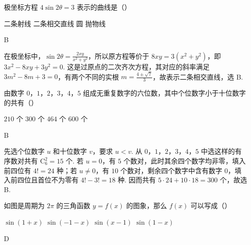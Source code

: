 \begin{problem}
极坐标方程 \(4\sin 2\theta=3\) 表示的曲线是（\quad）

\choices
    {二条射线}
    {二条相交直线}
    {圆}
    {抛物线}

\end{problem}

\begin{answer}
B
\end{answer}

\begin{solution}
在极坐标中，\(\sin2\theta=\frac{2xy}{x^2+y^2}\)，所以原方程等价于 \(8xy=3(x^2+y^2)\)，即 \(3x^2-8xy+3y^2=0\). 这是过原点的二次齐次方程，其对应的斜率满足 \(3m^2-8m+3=0\)，有两个不同的实根 \(m=\frac{4\pm\sqrt{7}}{3}\)，故表示二条相交直线，选 B.
\end{solution}

\begin{problem}
由数字 \(0\)，\(1\)，\(2\)，\(3\)，\(4\)，\(5\) 组成无重复数字的六位数，其中个位数字小于十位数字的共有（\quad）

\choices
    {\(210\) 个}
    {\(300\) 个}
    {\(464\) 个}
    {\(600\) 个}

\end{problem}

\begin{answer}
B
\end{answer}

\begin{solution}
先选个位数字 \(u\) 和十位数字 \(v\)，要求 \(u<v\). 从 \(0\)，\(1\)，\(2\)，\(3\)，\(4\)，\(5\) 中选这样的有序数对共有 \(\mathrm C_6^2=15\) 个. 若 \(u=0\)，有 \(5\) 个数对，此时其余四个数字均非零，填入前四位有 \(4!=24\) 种；若 \(u\neq0\)，有 \(10\) 个数对，剩余四个数字中含有数字 \(0\)，填入前四位且首位不为零有 \(4!-3!=18\) 种. 因而共有 \(5\cdot24+10\cdot18=300\) 个，故选 B.
\end{solution}

\begin{problem}
如图是周期为 \(2\pi\) 的三角函数 \(y=f(x)\) 的图象，那么 \(f(x)\) 可以写成（\quad）


\choices
    {\(\sin(1+x)\)}
    {\(\sin(-1-x)\)}
    {\(\sin(x-1)\)}
    {\(\sin(1-x)\)}

\end{problem}

\begin{answer}
D
\end{answer}

